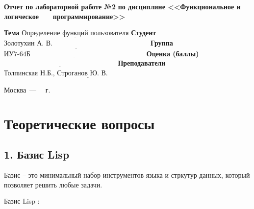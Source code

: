\documentclass[12pt]{report}
\begin{document}
\begin{titlepage}
		\begin{center}
			\noindent\begin{minipage}{1.1\textwidth}\centering
				\Large\textbf{  Отчет по лабораторной работе №2}\newline
				\textbf{по дисциплине <<Функциональное и логическое}\newline
				\textbf{~~~программирование>>}\newline\newline
			\end{minipage}
		\end{center}
		
		\noindent\textbf{Тема} $\underline{\text{Определение функций пользователя}}$\newline\newline
		\noindent\textbf{Студент} $\underline{\text{Золотухин А. В.~~~~~~~~~~~~~~~~~~~~~~~~~~~~~~~~~~~~~~~~~~}}$\newline\newline
		\noindent\textbf{Группа} $\underline{\text{ИУ7-64Б~~~~~~~~~~~~~~~~~~~~~~~~~~~~~~~~~~~~~~~~~~~~~~~~~~}}$\newline\newline
		\noindent\textbf{Оценка (баллы)} $\underline{\text{~~~~~~~~~~~~~~~~~~~~~~~~~~~~~~~~~~~~~~~~~~~~~~~~~}}$\newline\newline
		\noindent\textbf{Преподаватели} $\underline{\text{Толпинская Н.Б., Строганов Ю. В.~~~~~~~~~~~~~~~~~~~~~~~~~~~~}}$\newline\newline\newline
		
		\begin{center}
			\vfill
			Москва~---~\the\year
			~г.
		\end{center}
	\end{titlepage}
	
	\chapter*{Теоретические вопросы}
	
	\section*{1. Базис Lisp}
	
	Базис -- это минимальный набор инструментов языка и стркутур данных, который позволяет решить любые задачи.
	
	
	Базис Lisp :
	
\end{document}
